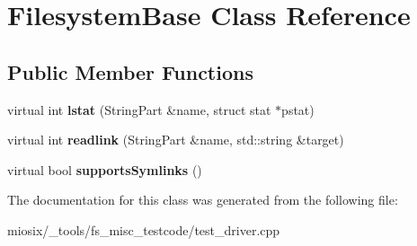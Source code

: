 \hypertarget{class_filesystem_base}{\section{Filesystem\-Base Class Reference}
\label{class_filesystem_base}
}
\subsection*{Public Member Functions}
\begin{DoxyCompactItemize}
\item 
\hypertarget{class_filesystem_base_a2f01faf6489510aef3dadbca5a5e3c30}{virtual int {\bfseries lstat} (String\-Part \&name, struct stat $\ast$pstat)}\label{class_filesystem_base_a2f01faf6489510aef3dadbca5a5e3c30}

\item 
\hypertarget{class_filesystem_base_a54f0959767b1b04e2702feda3ef83cab}{virtual int {\bfseries readlink} (String\-Part \&name, std\-::string \&target)}\label{class_filesystem_base_a54f0959767b1b04e2702feda3ef83cab}

\item 
\hypertarget{class_filesystem_base_a5293189b27efc4d6c083d17b6027707b}{virtual bool {\bfseries supports\-Symlinks} ()}\label{class_filesystem_base_a5293189b27efc4d6c083d17b6027707b}

\end{DoxyCompactItemize}


The documentation for this class was generated from the following file\-:\begin{DoxyCompactItemize}
\item 
miosix/\-\_\-tools/fs\-\_\-misc\-\_\-testcode/test\-\_\-driver.\-cpp\end{DoxyCompactItemize}
